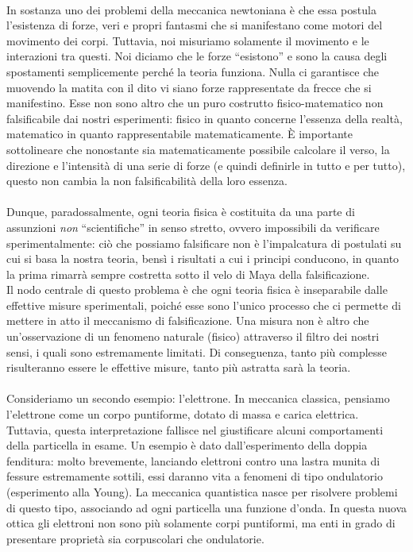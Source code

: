\documentclass[]{article}
\begin{document}
	\\
	In sostanza uno dei problemi della meccanica newtoniana è che essa postula l'esistenza di forze, veri e propri fantasmi che si manifestano come motori del movimento dei corpi. Tuttavia, noi misuriamo solamente il movimento e le interazioni tra questi. Noi diciamo che le forze \enquote{esistono} e sono la causa degli spostamenti semplicemente perché la teoria funziona. Nulla ci garantisce che muovendo la matita con il dito vi siano forze rappresentate da frecce che si manifestino. Esse non sono altro che un puro costrutto fisico-matematico non falsificabile dai nostri esperimenti: fisico in quanto concerne l'essenza della realtà, matematico in quanto rappresentabile matematicamente. \`E importante sottolineare che nonostante sia matematicamente possibile calcolare il verso, la direzione e l'intensità di una serie di forze (e quindi definirle in tutto e per tutto), questo non cambia la non falsificabilità della loro essenza.\\
	\\
	Dunque, paradossalmente, ogni teoria fisica è costituita da una parte di assunzioni \textit{non} \enquote{scientifiche} in senso stretto, ovvero impossibili da verificare sperimentalmente: ciò che possiamo falsificare non è l'impalcatura di postulati su cui si basa la nostra teoria, bensì i risultati a cui i principi conducono, in quanto la prima rimarrà sempre costretta sotto il velo di Maya della falsificazione.\\
	Il nodo centrale di questo problema è che ogni teoria fisica è inseparabile dalle effettive misure sperimentali, poiché esse sono l'unico processo che ci permette di mettere in atto il meccanismo di falsificazione. Una misura non è altro che un'osservazione di un fenomeno naturale (fisico) attraverso il filtro dei nostri sensi, i quali sono estremamente limitati. Di conseguenza, tanto più complesse risulteranno essere le effettive misure, tanto più astratta sarà la teoria. \\
	\\
	Consideriamo un secondo esempio: l'elettrone. In meccanica classica, pensiamo l'elettrone come un corpo puntiforme, dotato di massa e carica elettrica. Tuttavia, questa interpretazione fallisce nel giustificare alcuni comportamenti della particella in esame. Un esempio è dato dall'esperimento della doppia fenditura: molto brevemente, lanciando elettroni contro una lastra munita di fessure estremamente sottili, essi daranno vita a fenomeni di tipo ondulatorio (esperimento alla Young). La meccanica quantistica nasce per risolvere problemi di questo tipo, associando ad ogni particella una funzione d'onda. In questa nuova ottica gli elettroni non sono più solamente corpi puntiformi, ma enti in grado di presentare proprietà sia corpuscolari che ondulatorie.\\
\end{document}

